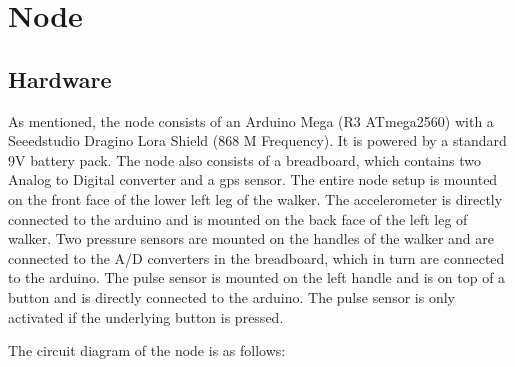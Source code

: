\section{Node} 
	\subsection{Hardware}
		As mentioned, the node consists of an Arduino Mega (R3 ATmega2560) with a Seeedstudio Dragino Lora Shield (868 M Frequency). It is powered by a standard 9V battery pack. The node also consists of a breadboard, which contains two Analog to Digital converter and a gps sensor. The entire node setup is mounted on the front face of the lower left leg of the walker. The accelerometer is directly connected to the arduino and is mounted on the back face of the left leg of walker. Two pressure sensors are mounted on the handles of the walker and are connected to the A/D converters in the breadboard, which in turn are connected to the arduino. The pulse sensor is mounted on the left handle and is on top of a button and is directly connected to the arduino. The pulse sensor is only activated if the underlying button is pressed. 

		The circuit diagram of the node is as follows:

